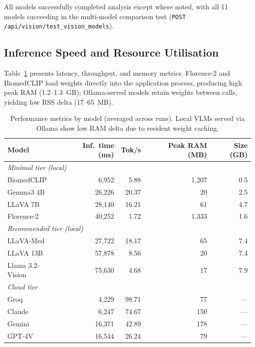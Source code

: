 \documentclass[12pt,a4paper]{report}
\begin{document}
All models successfully completed analysis except where noted, with all 11 models succeeding in the multi-model comparison test (\texttt{POST /api/vision/test\_vision\_models}).



\subsection{Inference Speed and Resource Utilisation}

Table~\ref{tab:performance_metrics} presents latency, throughput, and memory
metrics. Florence-2 and BiomedCLIP load weights directly into the application
process, producing high peak RAM (1.2--1.3~GB); Ollama-served models retain
weights between calls, yielding low RSS delta (17--65~MB).

\begin{table}[H]
\centering
\caption{Performance metrics by model (averaged across runs). Local VLMs served
via Ollama show low RAM delta due to resident weight caching.}
\label{tab:performance_metrics}
\small
\renewcommand{\arraystretch}{1.2}
\begin{tabularx}{\textwidth}{@{}l r r r r@{}}
\toprule
\textbf{Model} & \textbf{Inf.\ time (ms)} & \textbf{Tok/s} & \textbf{Peak RAM (MB)} & \textbf{Size (GB)} \\
\midrule
\multicolumn{5}{l}{\textit{Minimal tier (local)}} \\
BiomedCLIP        &  6,952 &  5.88 & 1{,}207 & 0.5 \\
Gemma3 4B         & 26,226 & 20.37 &      20 & 2.5 \\
LLaVA 7B          & 28,140 & 16.21 &      61 & 4.7 \\
Florence-2        & 40,252 &  1.72 & 1{,}333 & 1.6 \\
\midrule
\multicolumn{5}{l}{\textit{Recommended tier (local)}} \\
LLaVA-Med         & 27,722 & 18.17 &      65 & 7.4 \\
LLaVA 13B         & 57,878 &  8.56 &      20 & 7.4 \\
Llama 3.2-Vision  & 75,630 &  4.68 &      17 & 7.9 \\
\midrule
\multicolumn{5}{l}{\textit{Cloud tier}} \\
Groq              &  4,229 & 98.71 &      77 & ---   \\
Claude            &  6,247 & 74.67 &     150 & ---   \\
Gemini            & 16,371 & 42.89 &     178 & ---   \\
GPT-4V            & 16,544 & 26.24 &      79 & ---   \\
\bottomrule
\end{tabularx}
\end{table}
\end{document}
